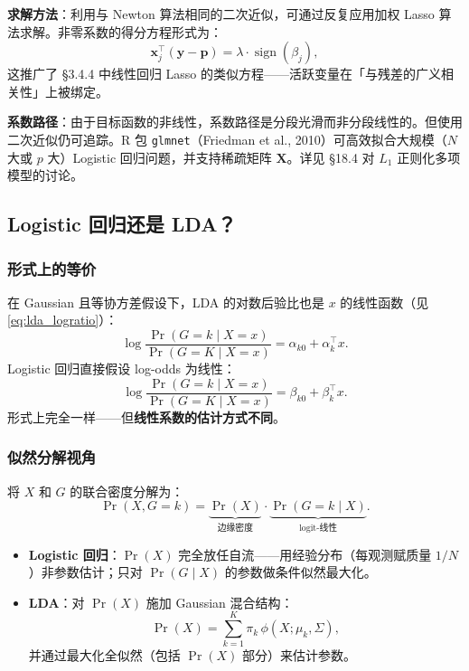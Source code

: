 \textbf{求解方法}：利用与 Newton 算法相同的二次近似，可通过反复应用加权 Lasso 算法求解。非零系数的得分方程形式为：
\begin{equation}\label{eq:l1_score}
    \mathbf{x}_j^\top (\mathbf{y} - \mathbf{p}) = \lambda \cdot \operatorname{sign}(\beta_j),
\end{equation}
这推广了 §3.4.4 中线性回归 Lasso 的类似方程——活跃变量在「与残差的广义相关性」上被绑定。

\textbf{系数路径}：由于目标函数的非线性，系数路径是分段光滑而非分段线性的。但使用二次近似仍可追踪。R 包 \texttt{glmnet}（Friedman et al., 2010）可高效拟合大规模（$N$ 大或 $p$ 大）Logistic 回归问题，并支持稀疏矩阵 $\mathbf{X}$。详见 §18.4 对 $L_1$ 正则化多项模型的讨论。


\subsection{Logistic 回归还是 LDA？}

\subsubsection{形式上的等价}

在 Gaussian 且等协方差假设下，LDA 的对数后验比也是 $x$ 的线性函数（见 \eqref{eq:lda_logratio}）：
\[
\log\frac{\Pr(G=k\mid X=x)}{\Pr(G=K\mid X=x)} = \alpha_{k0} + \alpha_k^\top x.
\]
Logistic 回归直接假设 log-odds 为线性：
\[
\log\frac{\Pr(G=k\mid X=x)}{\Pr(G=K\mid X=x)} = \beta_{k0} + \beta_k^\top x.
\]
形式上完全一样——但\textbf{线性系数的估计方式不同}。

\subsubsection{似然分解视角}

将 $X$ 和 $G$ 的联合密度分解为：
\begin{equation}\label{eq:joint_decomp}
    \Pr(X, G = k) = \underbrace{\Pr(X)}_{\text{边缘密度}} \cdot \underbrace{\Pr(G = k \mid X)}_{\text{logit-线性}}.
\end{equation}

\begin{itemize}
    \item \textbf{Logistic 回归}：$\Pr(X)$ 完全放任自流——用经验分布（每观测赋质量 $1/N$）非参数估计；只对 $\Pr(G\mid X)$ 的参数做条件似然最大化。
    \item \textbf{LDA}：对 $\Pr(X)$ 施加 Gaussian 混合结构：
    \[
    \Pr(X) = \sum_{k=1}^{K} \pi_k \,\phi(X; \mu_k, \Sigma),
    \]
    并通过最大化全似然（包括 $\Pr(X)$ 部分）来估计参数。
\end{itemize}

